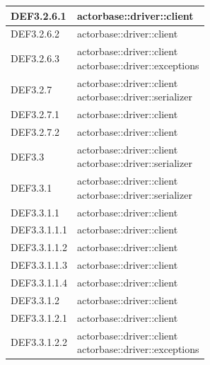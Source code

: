 \documentclass{scalatekids-article}
\begin{document}
\begin{longtable}[H]{|p{3.5cm}|p{7.5cm}|}
  \hline
  DEF3.2.6.1 & \multiLineCell[t]{actorbase::driver::client\\}\\
  \hline
  DEF3.2.6.2 & \multiLineCell[t]{actorbase::driver::client\\}\\
  \hline
  DEF3.2.6.3 & \multiLineCell[t]{actorbase::driver::client\\actorbase::driver::exceptions\\}\\
  \hline
  DEF3.2.7 & \multiLineCell[t]{actorbase::driver::client\\actorbase::driver::serializer\\}\\
  \hline
  DEF3.2.7.1 & \multiLineCell[t]{actorbase::driver::client\\}\\
  \hline
  DEF3.2.7.2 & \multiLineCell[t]{actorbase::driver::client\\}\\
  \hline
  DEF3.3 & \multiLineCell[t]{actorbase::driver::client\\actorbase::driver::serializer\\}\\
  \hline
  DEF3.3.1 & \multiLineCell[t]{actorbase::driver::client\\actorbase::driver::serializer\\}\\
  \hline
  DEF3.3.1.1 & \multiLineCell[t]{actorbase::driver::client\\}\\
  \hline
  DEF3.3.1.1.1 & \multiLineCell[t]{actorbase::driver::client\\}\\
  \hline
  DEF3.3.1.1.2 & \multiLineCell[t]{actorbase::driver::client\\}\\
  \hline
  DEF3.3.1.1.3 & \multiLineCell[t]{actorbase::driver::client\\}\\
  \hline
  DEF3.3.1.1.4 & \multiLineCell[t]{actorbase::driver::client\\}\\
  \hline
  DEF3.3.1.2 & \multiLineCell[t]{actorbase::driver::client\\}\\
  \hline
  DEF3.3.1.2.1 & \multiLineCell[t]{actorbase::driver::client\\}\\
  \hline
  DEF3.3.1.2.2 & \multiLineCell[t]{actorbase::driver::client\\actorbase::driver::exceptions\\}\\

\end{longtable}
\end{document}
